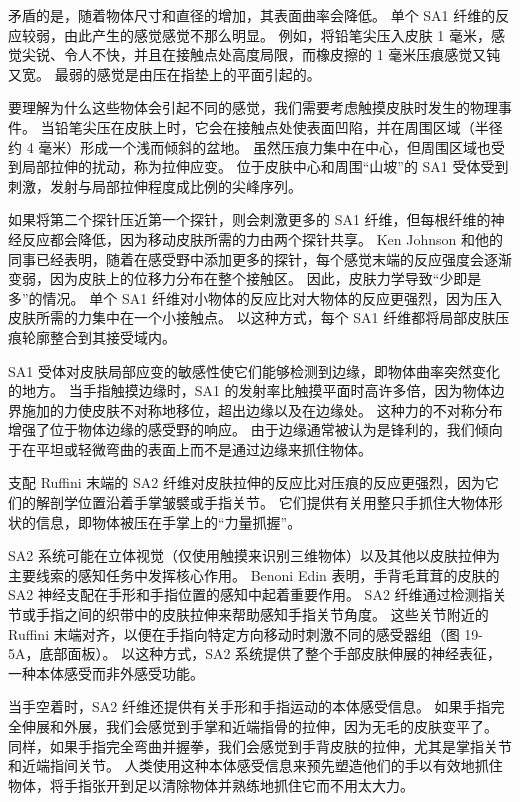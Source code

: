 矛盾的是，随着物体尺寸和直径的增加，其表面曲率会降低。 单个 SA1 纤维的反应较弱，由此产生的感觉感觉不那么明显。 例如，将铅笔尖压入皮肤 1 毫米，感觉尖锐、令人不快，并且在接触点处高度局限，而橡皮擦的 1 毫米压痕感觉又钝又宽。 最弱的感觉是由压在指垫上的平面引起的。

要理解为什么这些物体会引起不同的感觉，我们需要考虑触摸皮肤时发生的物理事件。 当铅笔尖压在皮肤上时，它会在接触点处使表面凹陷，并在周围区域（半径约 4 毫米）形成一个浅而倾斜的盆地。 虽然压痕力集中在中心，但周围区域也受到局部拉伸的扰动，称为拉伸应变。 位于皮肤中心和周围“山坡”的 SA1 受体受到刺激，发射与局部拉伸程度成比例的尖峰序列。

如果将第二个探针压近第一个探针，则会刺激更多的 SA1 纤维，但每根纤维的神经反应都会降低，因为移动皮肤所需的力由两个探针共享。 Ken Johnson 和他的同事已经表明，随着在感受野中添加更多的探针，每个感觉末端的反应强度会逐渐变弱，因为皮肤上的位移力分布在整个接触区。 因此，皮肤力学导致“少即是多”的情况。 单个 SA1 纤维对小物体的反应比对大物体的反应更强烈，因为压入皮肤所需的力集中在一个小接触点。 以这种方式，每个 SA1 纤维都将局部皮肤压痕轮廓整合到其接受域内。

SA1 受体对皮肤局部应变的敏感性使它们能够检测到边缘，即物体曲率突然变化的地方。 当手指触摸边缘时，SA1 的发射率比触摸平面时高许多倍，因为物体边界施加的力使皮肤不对称地移位，超出边缘以及在边缘处。 这种力的不对称分布增强了位于物体边缘的感受野的响应。 由于边缘通常被认为是锋利的，我们倾向于在平坦或轻微弯曲的表面上而不是通过边缘来抓住物体。

支配 Ruffini 末端的 SA2 纤维对皮肤拉伸的反应比对压痕的反应更强烈，因为它们的解剖学位置沿着手掌皱襞或手指关节。 它们提供有关用整只手抓住大物体形状的信息，即物体被压在手掌上的“力量抓握”。

SA2 系统可能在立体视觉（仅使用触摸来识别三维物体）以及其他以皮肤拉伸为主要线索的感知任务中发挥核心作用。 Benoni Edin 表明，手背毛茸茸的皮肤的 SA2 神经支配在手形和手指位置的感知中起着重要作用。 SA2 纤维通过检测指关节或手指之间的织带中的皮肤拉伸来帮助感知手指关节角度。 这些关节附近的 Ruffini 末端对齐，以便在手指向特定方向移动时刺激不同的感受器组（图 19-5A，底部面板）。 以这种方式，SA2 系统提供了整个手部皮肤伸展的神经表征，一种本体感受而非外感受功能。

当手空着时，SA2 纤维还提供有关手形和手指运动的本体感受信息。 如果手指完全伸展和外展，我们会感觉到手掌和近端指骨的拉伸，因为无毛的皮肤变平了。 同样，如果手指完全弯曲并握拳，我们会感觉到手背皮肤的拉伸，尤其是掌指关节和近端指间关节。 人类使用这种本体感受信息来预先塑造他们的手以有效地抓住物体，将手指张开到足以清除物体并熟练地抓住它而不用太大力。

